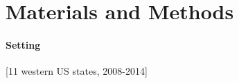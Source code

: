 \documentclass[authoryear]{elsarticle}
\begin{document}


\section{Materials and Methods}


\paragraph{Setting} [11 western US states, 2008-2014]
\end{document}
